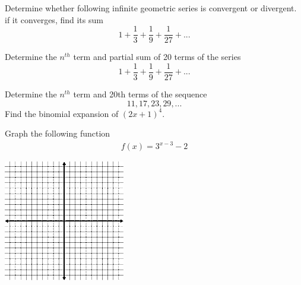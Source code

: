 \documentclass[11pt]{exam}
\begin{document}
\begin{questions}
\vspace{8cm}
\noaddpoints
\question[4] Determine whether following infinite geometric series is convergent or divergent. if it converges, find its sum \[1+\frac{1}{3}+\frac{1}{9}+\frac{1}{27}+...\]

\vspace{8cm}
\noaddpoints
\question[4] Determine the $n^{th}$ term and partial sum of 20  terms of the series \[1+\frac{1}{3}+\frac{1}{9}+\frac{1}{27}+...\]

\vspace{8cm}
\noaddpoints
\question[4] Determine the $n^{th}$ term and 20th  terms of the sequence \[11,17,23,29,...\]
\vspace{8cm}
\noaddpoints
\question[2] Find the binomial expansion of $(2x+1)^4$.

\vspace{8cm}
\addpoints
\question[5 bonus]  Graph the following function
\begin{align*}
f(x)=3^{x-3}-2
\end{align*}
\begin{center}
	\includegraphics{graph1.png}	
\end{center}
\end{questions}
\end{document}
